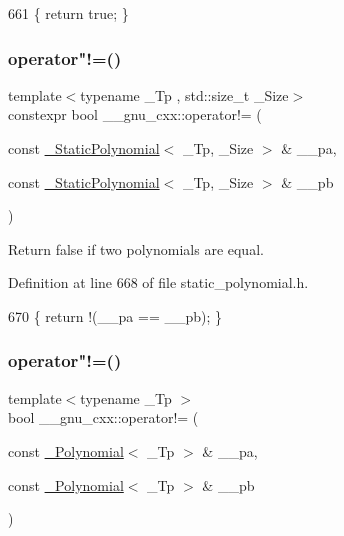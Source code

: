 \begin{DoxyCode}
661     \{ \textcolor{keywordflow}{return} \textcolor{keyword}{true}; \}
\end{DoxyCode}
\mbox{\label{namespace____gnu__cxx_ac759e59bd5e23de4cbd603b846081718}} 
\subsubsection{\texorpdfstring{operator"!=()}{operator!=()}\hspace{0.1cm}{\footnotesize\ttfamily [2/3]}}
{\footnotesize\ttfamily template$<$typename \+\_\+\+Tp , std\+::size\+\_\+t \+\_\+\+Size$>$ \\
constexpr bool \+\_\+\+\_\+gnu\+\_\+cxx\+::operator!= (\begin{DoxyParamCaption}\item[{const \hyperlink{class____gnu__cxx_1_1__StaticPolynomial}{\+\_\+\+Static\+Polynomial}$<$ \+\_\+\+Tp, \+\_\+\+Size $>$ \&}]{\+\_\+\+\_\+pa,  }\item[{const \hyperlink{class____gnu__cxx_1_1__StaticPolynomial}{\+\_\+\+Static\+Polynomial}$<$ \+\_\+\+Tp, \+\_\+\+Size $>$ \&}]{\+\_\+\+\_\+pb }\end{DoxyParamCaption})\hspace{0.3cm}{\ttfamily [inline]}}

Return false if two polynomials are equal. 

Definition at line 668 of file static\+\_\+polynomial.\+h.


\begin{DoxyCode}
670     \{ \textcolor{keywordflow}{return} !(\_\_pa == \_\_pb); \}
\end{DoxyCode}
\mbox{\label{namespace____gnu__cxx_a1279934a2d6df66704c6eab9113b0f97}} 
\subsubsection{\texorpdfstring{operator"!=()}{operator!=()}\hspace{0.1cm}{\footnotesize\ttfamily [3/3]}}
{\footnotesize\ttfamily template$<$typename \+\_\+\+Tp $>$ \\
bool \+\_\+\+\_\+gnu\+\_\+cxx\+::operator!= (\begin{DoxyParamCaption}\item[{const \hyperlink{class____gnu__cxx_1_1__Polynomial}{\+\_\+\+Polynomial}$<$ \+\_\+\+Tp $>$ \&}]{\+\_\+\+\_\+pa,  }\item[{const \hyperlink{class____gnu__cxx_1_1__Polynomial}{\+\_\+\+Polynomial}$<$ \+\_\+\+Tp $>$ \&}]{\+\_\+\+\_\+pb }\end{DoxyParamCaption})\hspace{0.3cm}{\ttfamily [inline]}}

